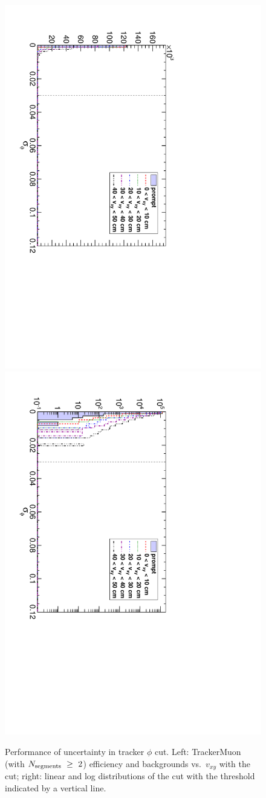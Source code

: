 \documentclass[12pt]{article}
\newcommand{\s}[1]{{\mbox{\scriptsize #1}}}
\begin{document}
\begin{figure}
\begin{center}
\begin{multicols}{2}
\includegraphics[height=\linewidth, angle=90]{fig/backgrounds3_plot/trackslinear_phierr.pdf}
\includegraphics[height=\linewidth, angle=90]{fig/backgrounds3_plot/trackslog_phierr.pdf}
\end{multicols}

\caption{Performance of uncertainty in tracker $\phi$ cut.  Left: TrackerMuon (with $N_\s{segments}~\ge~2$) efficiency and backgrounds vs.\ $v_{xy}$ with the cut; right: linear and log distributions of the cut with the threshold indicated by a vertical line. \label{fig:phierr}}
\end{center}
\end{figure}
\end{document}
